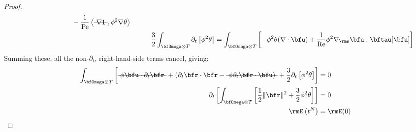 \begin{proof}
\begin{align}
\begin{split}
                &\;\;\;\;\;\;\;\;\;\;\;\;\;\;\;\;\;\;\;\;\;\;\;\;\;\;\;\;\;\;\;\;- \frac{1}{\rmPe}\left\langle\mst{\nabla 1}, \phi^{2}\nabla\theta\right\rangle
            \end{split}  \\
            &&&&  \frac{3}{2}\int_{\bfOmega\otimes T}\partial_{t}\left[\phi^{2}\theta\right]  &=  \int_{\bfOmega\otimes T}\left[- \phi^{2}\theta(\nabla\cdot\bfu) + \frac{1}{\rmRe}\phi^{2}\nabla_{\rms}\bfu:\bftau[\bfu]\right]
        \end{align}
        Summing these, all the non-$\partial_{t}$, right-hand-side terms cancel, giving:
        \begin{align}
            \int_{\bfOmega\otimes T}\left[\mst{\phi\bfu\cdot\partial_{t}\bfr} + (\partial_{t}\bfr\cdot\bfr - \mst{\phi\partial_{t}\bfr\cdot\bfu)} + \frac{3}{2}\partial_{t}\left[\phi^{2}\theta\right]\right]  &=  0  \\
            \partial_{t}\left[\int_{\bfOmega\otimes T}\left[\frac{1}{2}\|\bfr\|^{2} + \frac{3}{2}\phi^{2}\theta\right]\right]  &=  0  \\
            \rmE\left(t^{N}\right)  &=  \rmE(0)
        \end{align}
    \end{proof}
    